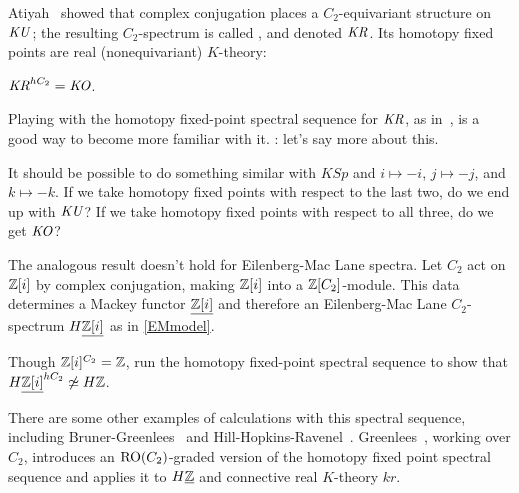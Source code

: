 \begin{exm}
Atiyah~\cite{AtiyahKR} showed that complex conjugation places a $C_2$-equivariant structure on $\mathit{KU}$; the resulting
$C_2$-spectrum is called , and denoted $\mathit{KR}$. Its homotopy fixed points are real
(nonequivariant) $K$-theory:
\begin{thm}
$\mathit{KR}^{hC_2} = \mathit{KO}$.
\end{thm}
Playing with the homotopy fixed-point spectral sequence for $\mathit{KR}$, as in~\cite{HS14}, is a good way to become more
familiar with it. \TODO: let's say more about this.
\end{exm}
\begin{ques}
It should be possible to do something similar with $\mathit{KSp}$ and $i\mapsto -i$, $j\mapsto -j$, and $k\mapsto
-k$. If we take homotopy fixed points with respect to the last two, do we end up with $\mathit{KU}$? If we take homotopy
fixed points with respect to all three, do we get $\mathit{KO}$?
\end{ques}
\begin{ex}
The analogous result doesn't hold for Eilenberg-Mac Lane spectra. Let $C_2$ act on $\mathbb Z[i]$ by complex conjugation,
making $\mathbb Z[i]$ into a $\mathbb Z[C_2]$-module. This data determines a Mackey functor $\underline{\mathbb Z[i]}$ and therefore an
Eilenberg-Mac Lane $C_2$-spectrum $H\underline{\mathbb Z[i]}$ as in \cref{EMmodel}.

Though $\mathbb Z[i]^{C_2} = \mathbb Z$, run the homotopy fixed-point spectral sequence to show that
$H\underline{\mathbb Z[i]}^{hC_2}\not\simeq H\mathbb Z$.
\end{ex}
There are some other examples of calculations with this spectral sequence, including Bruner-Greenlees~\cite{BG10}
and Hill-Hopkins-Ravenel~\cite{HHREO2, HHR}. Greenlees~\cite{GreenCalc}, working over $C_2$, introduces an
$\mathrm{RO}(C_2)$-graded version of the homotopy fixed point spectral sequence and applies it to $H\underline{\mathbb Z}$ and
connective real $K$-theory $\mathit{kr}$.
